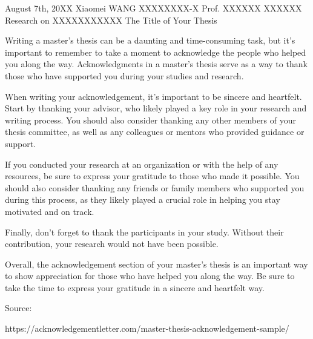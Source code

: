 \documentclass[12pt]{article}
\begin{document}
\begin{cover}
{August 7th, 20XX} %
{Xiaomei WANG} %
{XXXXXXXX-X} %
{Prof. XXXXXX XXXXXX} %
{Research on XXXXXXXXXXX} %
{The Title of Your Thesis} %
\end{cover}

\makeatletter
\def\section{\@startsection{section}{1}{\z@}
             {-3.5ex \@plus -1ex \@minus -.2ex}
             {5ex \@plus.2ex}
             {\clearpage\bf\Large\centering}}
\makeatother

\begin{acknowledgements}
Writing a master’s thesis can be a daunting and time-consuming task, but it’s important to remember to take a moment to acknowledge the people who helped you along the way. Acknowledgments in a master’s thesis serve as a way to thank those who have supported you during your studies and research.

When writing your acknowledgement, it’s important to be sincere and heartfelt. Start by thanking your advisor, who likely played a key role in your research and writing process. You should also consider thanking any other members of your thesis committee, as well as any colleagues or mentors who provided guidance or support.

If you conducted your research at an organization or with the help of any resources, be sure to express your gratitude to those who made it possible. You should also consider thanking any friends or family members who supported you during this process, as they likely played a crucial role in helping you stay motivated and on track.

Finally, don’t forget to thank the participants in your study. Without their contribution, your research would not have been possible.

Overall, the acknowledgement section of your master’s thesis is an important way to show appreciation for those who have helped you along the way. Be sure to take the time to express your gratitude in a sincere and heartfelt way.

Source: 

https://acknowledgementletter.com/master-thesis-acknowledgement-sample/
\end{acknowledgements}
\end{document}
